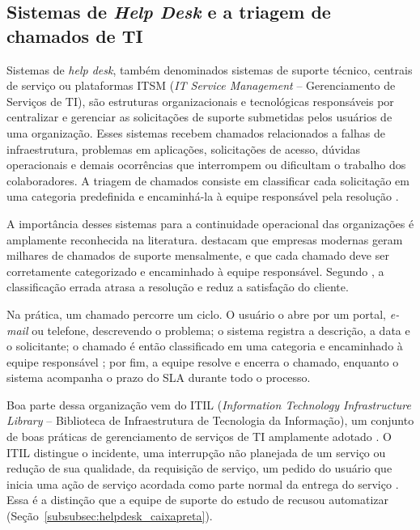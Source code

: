 \documentclass[
    12pt,                %
    openright,           %
    oneside,             %
    a4paper,             %
    english,             %
    brazil               %
]{abntex2}
\begin{document}
\subsection{Sistemas de \textit{Help Desk} e a triagem de chamados de TI}

Sistemas de \textit{help desk}, também denominados sistemas de suporte técnico, centrais de serviço ou plataformas ITSM (\textit{IT Service Management} -- Gerenciamento de Serviços de TI), são estruturas organizacionais e tecnológicas responsáveis por centralizar e gerenciar as solicitações de suporte submetidas pelos usuários de uma organização. Esses sistemas recebem chamados relacionados a falhas de infraestrutura, problemas em aplicações, solicitações de acesso, dúvidas operacionais e demais ocorrências que interrompem ou dificultam o trabalho dos colaboradores. A triagem de chamados consiste em classificar cada solicitação em uma categoria predefinida e encaminhá-la à equipe responsável pela resolução \cite{zemp2021}.

A importância desses sistemas para a continuidade operacional das organizações é amplamente reconhecida na literatura.  destacam que empresas modernas geram milhares de chamados de suporte mensalmente, e que cada chamado deve ser corretamente categorizado e encaminhado à equipe responsável. Segundo , a classificação errada atrasa a resolução e reduz a satisfação do cliente.

Na prática, um chamado percorre um ciclo. O usuário o abre por um portal, \textit{e-mail} ou telefone, descrevendo o problema; o sistema registra a descrição, a data e o solicitante; o chamado é então classificado em uma categoria e encaminhado à equipe responsável \cite{zemp2021}; por fim, a equipe resolve e encerra o chamado, enquanto o sistema acompanha o prazo do SLA durante todo o processo.

Boa parte dessa organização vem do ITIL (\textit{Information Technology Infrastructure Library} -- Biblioteca de Infraestrutura de Tecnologia da Informação), um conjunto de boas práticas de gerenciamento de serviços de TI amplamente adotado \cite{axelos2019}. O ITIL distingue o incidente, uma interrupção não planejada de um serviço ou redução de sua qualidade, da requisição de serviço, um pedido do usuário que inicia uma ação de serviço acordada como parte normal da entrega do serviço \cite{axelos2019}. Essa é a distinção que a equipe de suporte do estudo de  recusou automatizar (Seção~\ref{subsubsec:helpdesk_caixapreta}).
\end{document}
